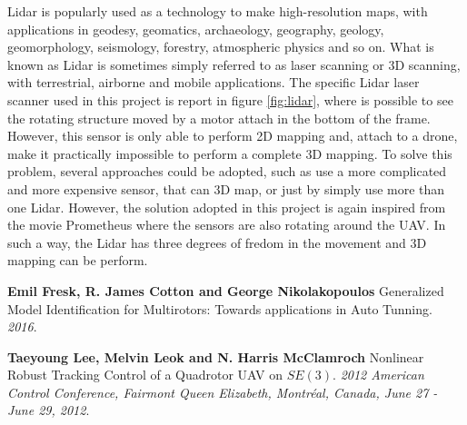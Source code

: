 \documentclass[11pt, a4paper, onecolumn, fleqn, twoside, titlepage, openright]{book}
\begin{document}
	\noindent Lidar is popularly used as a technology to make high-resolution maps, with applications in geodesy, geomatics, archaeology, geography, geology, geomorphology, seismology, forestry, atmospheric physics and so on. What is known as Lidar is sometimes simply referred to as laser scanning or 3D scanning, with terrestrial, airborne and mobile applications. The specific Lidar laser scanner used in this project is report in figure \ref{fig:lidar}, where is possible to see the rotating structure moved by a motor attach in the bottom of the frame. However, this sensor is only able to perform 2D mapping and, attach to a drone, make it practically impossible to perform a complete 3D mapping. To solve this problem, several approaches could be adopted, such as use a more complicated and more expensive sensor, that can 3D map, or just by simply use more than one Lidar. However, the solution adopted in this project is again inspired from the movie Prometheus where the sensors are also rotating around the UAV. In such a way, the Lidar has three degrees of fredom in the movement and 3D mapping can be perform.









	\begin{thebibliography}{1}
	\label{bibliography}

		\textbf{Emil Fresk, R. James Cotton and George Nikolakopoulos}
		Generalized Model Identification for Multirotors: Towards applications in Auto Tunning.
		\textit{2016}.

		\textbf{Taeyoung Lee, Melvin Leok and N. Harris McClamroch}
		Nonlinear Robust Tracking Control of a Quadrotor UAV on $SE(3)$.
		\textit{2012 American Control Conference, Fairmont Queen Elizabeth, Montréal, Canada, June 27 - June 29, 2012}.

	\end{thebibliography}
\end{document}
